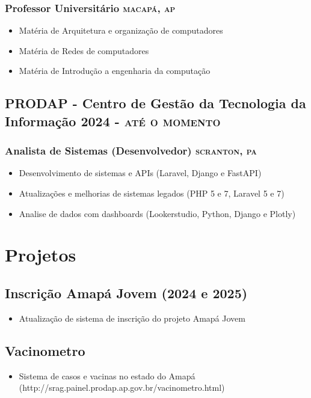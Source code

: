 \documentclass{article}
\newcommand{\rside}[1]{\hfill \normalfont\scshape\MakeLowercase{#1}}
\begin{document}
\subsubsection{ Professor Universitário  \rside{Macapá, AP}}
\begin{itemize}
  \item Matéria de Arquitetura e organização de computadores
  \item Matéria de Redes de computadores
  \item Matéria de Introdução a engenharia da computação
\end{itemize}

\subsection{PRODAP - Centro de Gestão da Tecnologia da Informação \rside{2024 - Até o momento}}
\subsubsection{Analista de Sistemas (Desenvolvedor)  \rside{Scranton, PA}}
\begin{itemize}
  \item Desenvolvimento de sistemas e APIs (Laravel, Django e FastAPI)
  \item Atualizações e melhorias de sistemas legados (PHP 5 e 7, Laravel 5 e 7)
  \item Analise de dados com dashboards (Lookerstudio, Python, Django e Plotly)
\end{itemize}


\section{\faFlask\enspace Projetos}

\subsection{Inscrição Amapá Jovem (2024 e 2025)}
\begin{itemize}
  \item Atualização de sistema de inscrição do projeto Amapá Jovem
\end{itemize}

\subsection{Vacinometro}
\begin{itemize}
  \item Sistema de casos e vacinas no estado do Amapá (http://srag.painel.prodap.ap.gov.br/vacinometro.html)
\end{itemize}
\end{document}
